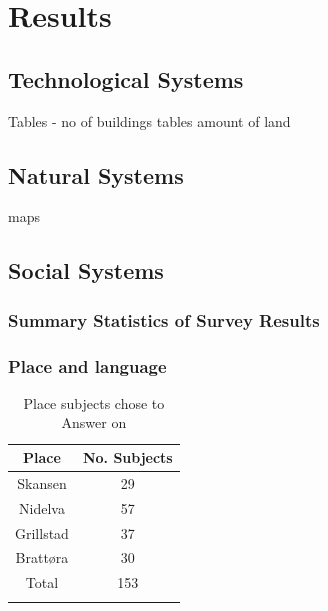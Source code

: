 \chapter{Results}

\section{Technological Systems}
Tables - no of buildings
tables  amount of land

\section{Natural Systems}
maps
\section{Social Systems}



\subsection{Summary Statistics of Survey Results}


\subsection{Place and language}

\begin{table}[]
    \centering
    \begin{tabular}{c|c}
    \\ \hline
       Place  & No. Subjects  \\ \hline
      Skansen   & 29    \\ \hline
      Nidelva & 57      \\ \hline
      Grillstad & 37       \\ \hline
      Brattøra & 30     \\ \hline
      Total & 153   \\ \hline
      \\ \hline
    \end{tabular}
    \caption{Place subjects chose to Answer on }
    \label{tab:place}
\end{table}
\paragraph{}

